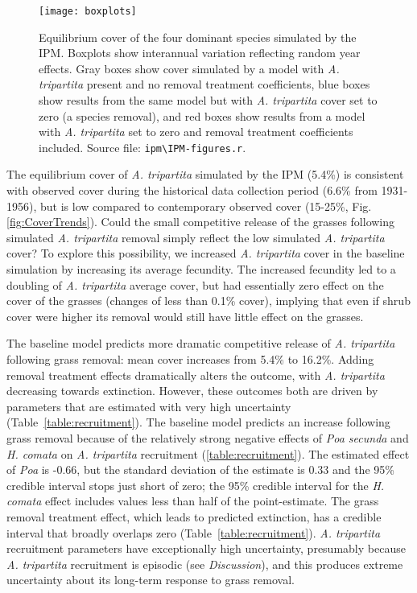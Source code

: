\documentclass[11pt]{article}
\begin{document}
\begin{doublespacing}
 \begin{figure}[tbp]
 \centering
 \texttt{[image: boxplots]}
 \caption{Equilibrium cover of the four dominant species simulated by the IPM. Boxplots show interannual variation reflecting random year effects. Gray boxes show cover simulated by a model with \textit{A. tripartita} present and no removal treatment coefficients, blue boxes show results from the same model but with \textit{A. tripartita} cover set to zero (a species removal), and red boxes show results from a model with \textit{A. tripartita} set to zero and removal treatment coefficients included. Source file: \texttt{ipm\textbackslash IPM-figures.r}.}
 \label{fig:IPMresults}
 \end{figure}
 
The equilibrium cover of \textit{A. tripartita} simulated by the IPM (5.4\%) is consistent with observed cover during the historical data collection period (6.6\% from 1931-1956), but is low compared to contemporary observed cover (15-25\%, Fig. \ref{fig:CoverTrends}). Could the small competitive release of the grasses
following simulated \textit{A. tripartita} removal simply reflect the low simulated \textit{A. tripartita} cover? To explore this possibility, we increased \textit{A. tripartita} cover in the baseline simulation by increasing its average fecundity. The increased fecundity led to a doubling of \textit{A. tripartita} average cover, but had essentially zero effect on the cover of the grasses (changes of less than 0.1\% cover), implying that even if shrub cover were higher its removal would still have little effect on the grasses. 
 
The baseline model predicts more dramatic competitive release of \textit{A. tripartita} following grass removal: mean cover increases from 5.4\% to 16.2\%. Adding
removal treatment effects dramatically alters the outcome, with \textit{A. tripartita} decreasing towards extinction. However, these outcomes both are driven
by parameters that are estimated with very high uncertainty (Table~\ref{table:recruitment}). The baseline model predicts an increase following grass removal because of the relatively strong negative effects of \textit{Poa secunda} and \textit{H. comata} on \textit{A. tripartita} recruitment (\ref{table:recruitment}). The estimated effect of
\emph{Poa} is -0.66, but the standard deviation of the estimate is 0.33 and the 95\% credible interval stops just short of zero; the 95\% credible interval for the
\textit{H. comata} effect includes values less than half of the point-estimate. The grass removal treatment effect, which leads to predicted extinction, has a credible 
interval that broadly overlaps zero (Table~\ref{table:recruitment}). \textit{A. tripartita} recruitment parameters have exceptionally high uncertainty, presumably 
because \textit{A. tripartita} recruitment is episodic (see \emph{Discussion}), and this produces extreme uncertainty about its long-term 
response to grass removal.


\end{doublespacing}
\end{document}
